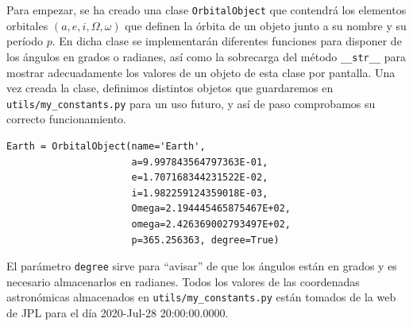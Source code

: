 Para empezar, se ha creado una clase \texttt{OrbitalObject} que contendrá los elementos orbitales $(a,e,i,\Omega,\omega)$ que definen la órbita de un objeto junto a su nombre y su período $p$. En dicha clase se implementarán diferentes funciones para disponer de los ángulos en grados o radianes, así como la sobrecarga del método \texttt{\_\_str\_\_} para mostrar adecuadamente los valores de un objeto de esta clase por pantalla. Una vez creada la clase, definimos distintos objetos que guardaremos en \texttt{utils/my\_constants.py} para un uso futuro, y así de paso comprobamos su correcto funcionamiento.
\begin{lstlisting}[style=PythonCode]
Earth = OrbitalObject(name='Earth',
                      a=9.997843564797363E-01,
                      e=1.707168344231522E-02,
                      i=1.982259124359018E-03,
                      Omega=2.194445465875467E+02,
                      omega=2.426369002793497E+02,
                      p=365.256363, degree=True)
\end{lstlisting}

El parámetro \texttt{degree} sirve para ``avisar'' de que los ángulos están en grados y es necesario almacenarlos en radianes. Todos los valores de las coordenadas astronómicas almacenados en \texttt{utils/my\_constants.py} están tomados de la web de JPL \cite{jpl} para el día 2020-Jul-28 20:00:00.0000.\\


